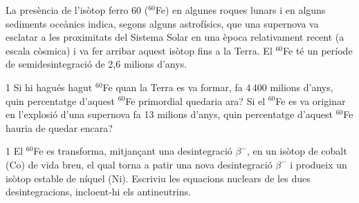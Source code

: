 La presència de l'isòtop ferro 60 ($^{60}$Fe) en algunes roques lunars i en alguns sediments oceànics indica, segons alguns astrofísics, que una supernova va esclatar a les proximitats del Sistema Solar en una època relativament recent (a escala còsmica) i va fer arribar aquest isòtop fins a la Terra. El $^{60}$Fe té un període de semidesintegració de 2,6 milions d'anys.

\begin{apartat}{1}
Si hi hagués hagut $^{60}$Fe quan la Terra es va formar, fa 4\,400 milions d'anys, quin percentatge d'aquest $^{60}$Fe primordial quedaria ara? Si el $^{60}$Fe es va originar en l'explosió d'una supernova fa 13 milions d'anys, quin percentatge d'aquest $^{60}$Fe hauria de quedar encara?
\end{apartat}

\begin{apartat}{1}
El $^{60}$Fe es transforma, mitjançant una desintegració $\beta^-$, en un isòtop de cobalt (Co) de vida breu, el qual torna a patir una nova desintegració $\beta^-$ i produeix un isòtop estable de níquel (Ni). Escriviu les equacions nuclears de les dues desintegracions, incloent-hi els antineutrins.
\end{apartat}

